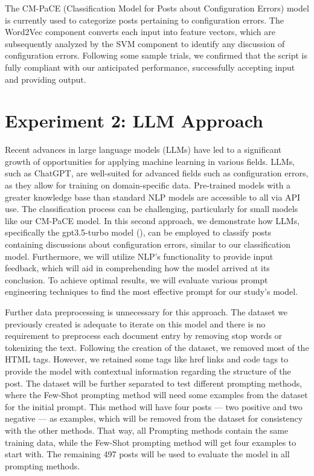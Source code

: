 \documentclass[english,bachelor]{swsLeipzig}
\begin{document}
The CM-PaCE (Classification Model for Posts about Configuration Errors) model is currently used to categorize posts 
pertaining to configuration errors. The Word2Vec component converts each input into feature vectors, which are subsequently analyzed by the SVM component to identify any discussion of configuration errors. Following some sample trials, we confirmed that the script is fully compliant with our anticipated performance, successfully accepting input and providing output.

\section{Experiment 2: LLM Approach}
Recent advances in large language models (LLMs) have led to a significant growth of opportunities for applying machine 
learning in various fields. LLMs, such as ChatGPT, are well-suited for advanced fields such as configuration errors, as they allow for training on domain-specific data. Pre-trained models with a greater knowledge base than standard NLP models are accessible to all via API use. The classification process can be challenging, particularly for small models like our CM-PaCE model. In this second approach, we demonstrate how LLMs, specifically the gpt3.5-turbo model (\citeauthor{openai:2023}), can be employed to classify posts containing discussions about configuration errors, similar to our classification model. Furthermore, we will utilize NLP's functionality to provide input feedback, which will aid in comprehending how the model arrived at its conclusion. To achieve optimal results, we will evaluate various prompt engineering techniques to find the most effective prompt for our study's model.

Further data preprocessing is unnecessary for this approach. The dataset we previously created is adequate to iterate 
on this model and there is no requirement to preprocess each document entry by removing stop words or tokenizing the text. Following the creation of the dataset, we removed most of the HTML tags. However, we retained some tags like href links and code tags to provide the model with contextual information regarding the structure of the post. The dataset will be further separated to test different prompting methods, where the Few-Shot prompting method will need some examples from the dataset for the initial prompt. This method will have four posts --- two positive and two negative --- as examples, which will be removed from the dataset for consistency with the other methods. That way, all Prompting methods contain the same training data, while the Few-Shot prompting method will get four examples to start with. The remaining 497 posts will be used to evaluate the model in all prompting methods.
\end{document}
